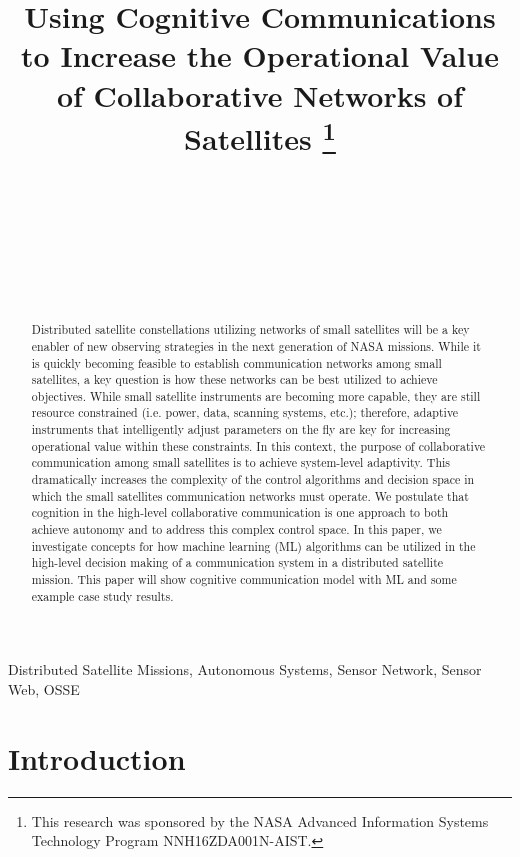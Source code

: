 \documentclass[conference]{IEEEtran}
\title{{Using Cognitive Communications to Increase the Operational Value of
    Collaborative Networks of Satellites}
  \thanks{This research was sponsored by the NASA Advanced Information Systems
    Technology Program NNH16ZDA001N-AIST.}
}
\author{
  \IEEEauthorblockN{Ryan B. Linnabary}
  \IEEEauthorblockA{\thisplace linnabary.24@osu.edu}
  \and
  \IEEEauthorblockN{Andrew J. O'Brien}
  \IEEEauthorblockA{\thisplace obrien.200@osu.edu}
  \and
  \IEEEauthorblockN{Graeme E. Smith}
  \IEEEauthorblockA{\thisplace smith.8347@osu.edu}
  \and
  \IEEEauthorblockN{Christopher Ball}
  \IEEEauthorblockA{\thisplace ball.51@osu.edu}
  \and {~} \and {~~~~~~~~~~~~~~} \and
  \IEEEauthorblockN{Joel T. Johnson}
  \IEEEauthorblockA{\thisplace johnson.1374@osu.edu}
  \and {~~~~~~} \and {~~~~~~}
}
\begin{document}
\maketitle


\begin{abstract}

  Distributed satellite constellations utilizing networks of small satellites will be a {\color{black} key} enabler of new observing strategies in the next generation of NASA missions.  {\color{black} While} it is quickly becoming feasible to establish communication networks among small satellites, a {\color{black} key} question is how these networks can be best utilized to achieve objectives.  {\color{black} While} small satellite instruments are becoming more capable, they are still resource constrained (i.e. power, data, scanning systems, etc.); therefore, adaptive instruments that intelligently adjust parameters on the fly are {\color{black} key} for increasing operational value within these constraints.  In this context, the purpose of collaborative communication among small satellites is to achieve system-level adaptivity.  This dramatically increases the complexity of the control algorithms and decision space in which the small satellites communication networks must operate.  We postulate that cognition in the high-level collaborative communication is one approach to both achieve autonomy and to address this complex control space.  In this paper, we investigate concepts for how machine learning (ML) algorithms can be utilized in the high-level decision making of a communication system in a distributed satellite mission.  This paper will show cognitive communication model with ML and some example case study results.

\end{abstract}

\begin{IEEEkeywords}

  Distributed Satellite Missions, Autonomous Systems, Sensor Network, Sensor Web, OSSE

\end{IEEEkeywords}


\section{Introduction}
\label{sec:intro}
\end{document}
